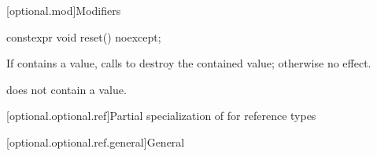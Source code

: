 [optional.mod]{Modifiers}

%
\begin{itemdecl}
constexpr void reset() noexcept;
\end{itemdecl}

\begin{itemdescr}
\pnum
\effects
If  contains a value, calls  to destroy the contained value; otherwise no effect.

\pnum
\ensures
{} does not contain a value.
\end{itemdescr}

[optional.optional.ref]{Partial specialization of  for reference types}

[optional.optional.ref.general]{General}

